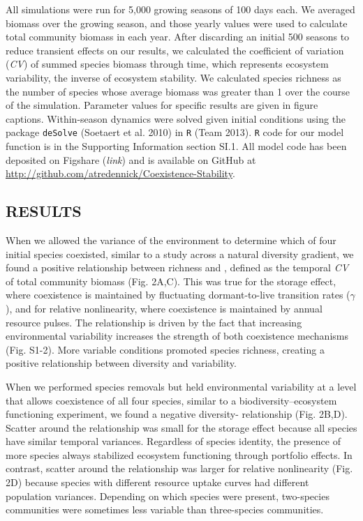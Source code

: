 \documentclass[12pt,]{article}
\begin{document}
All simulations were run for 5,000 growing seasons of 100 days each. We
averaged biomass over the growing season, and those yearly values were
used to calculate total community biomass in each year. After discarding
an initial 500 seasons to reduce transient effects on our results, we
calculated the coefficient of variation (\emph{CV}) of summed species
biomass through time, which represents ecosystem variability, the
inverse of ecosystem stability. We calculated species richness as the
number of species whose average biomass was greater than 1 over the
course of the simulation. Parameter values for specific results are
given in figure captions. Within-season dynamics were solved given
initial conditions using the package \texttt{deSolve} (Soetaert et al.
2010) in \texttt{R} (Team 2013). \texttt{R} code for our model function
is in the Supporting Information section SI.1. All model code has been
deposited on Figshare (\emph{link}) and is available on GitHub at
\url{http://github.com/atredennick/Coexistence-Stability}.

\subsection{RESULTS}\label{results}

When we allowed the variance of the environment to determine which of
four initial species coexisted, similar to a study across a natural
diversity gradient, we found a positive relationship between richness
and , defined as the temporal \emph{CV} of
total community biomass (Fig. 2A,C). This was true for the storage
effect, where coexistence is maintained by fluctuating dormant-to-live
transition rates (\(\gamma\)), and for relative nonlinearity, where
coexistence is maintained by annual resource pulses. The relationship is
driven by the fact that increasing environmental variability increases
the strength of both coexistence mechanisms (Fig. S1-2). More variable
conditions promoted species richness, creating a positive relationship
between diversity and  variability.

When we performed species removals but held environmental variability at
a level that allows coexistence of all four species, similar to a
biodiversity--ecosystem functioning experiment, we found a negative
diversity- relationship (Fig. 2B,D). Scatter
around the relationship was small for the storage effect because all
species have similar temporal variances. Regardless of species identity,
the presence of more species always stabilized ecosystem functioning
through portfolio effects. In contrast, scatter around the relationship
was larger for relative nonlinearity (Fig. 2D) because species with
different resource uptake curves had different population variances.
Depending on which species were present, two-species communities were
sometimes less variable than three-species communities.
\end{document}
